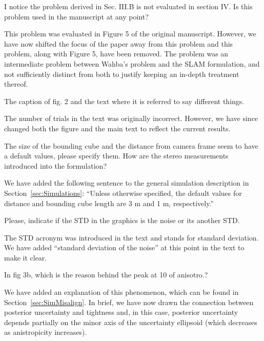 I notice the problem derived in Sec. III.B is not evaluated in section IV. Is this problem used in the manuscript at any point? 
\begin{response}
    This problem was evaluated in Figure 5 of the original manuscript. However, we have now shifted the focus of the paper away from this problem and this problem, along with Figure 5, have been removed. The problem was an intermediate problem between Wahba's problem and the SLAM formulation, and not sufficiently distinct from both to justify keeping an in-depth treatment thereof.
\end{response}

The caption of fig. 2 and the text where it is referred to say different things.  
\begin{response}
The number of trials in the text was originally incorrect. However, we have since changed both the figure and the main text to reflect the current results. 
\end{response}

The size of the bounding cube and the distance from camera frame seem  to have a default values, please specify them. How are the stereo measurements introduced into the formulation?
\begin{response}
    We have added the following sentence to the general simulation description in Section~\ref{sec:Simulations}: ``Unless otherwise specified, the default values for distance and bounding cube length are 3 m and 1 m, respectively.''
\end{response}

Please, indicate if the STD in the graphics is the noise or its another STD. 
\begin{response}
    The STD acronym was introduced in the text and stands for standard deviation. We have added ``standard deviation of the noise'' at this point in the text to make it clear. 
\end{response}

In fig 3b, which is the reason behind the peak at 10 of anisotro.? 
\begin{response}
    We have added an explanation of this phenomenon, which can be found in Section~\ref{sec:SimMisalign}. In brief, we have now drawn the connection between posterior uncertainty and tightness and, in this case, posterior uncertainty depends partially on the minor axis of the uncertainty ellipsoid (which decreases as anistropicity increases).
\end{response}

